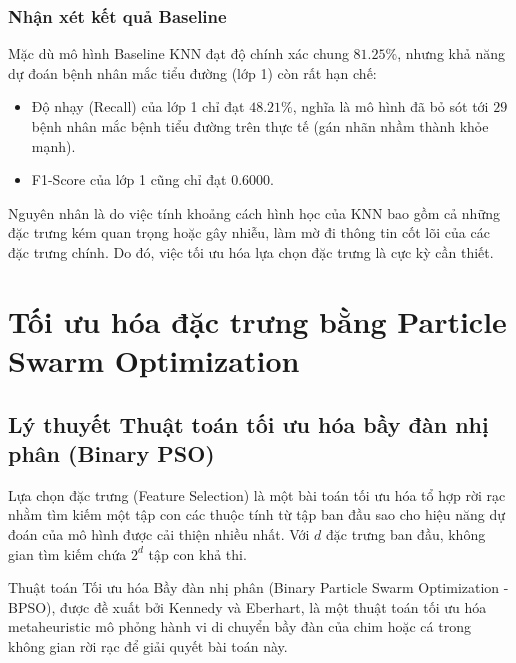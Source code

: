 \documentclass[a4paper,12pt]{report}
\begin{document}
\begin{itemize}
\subsection{Nhận xét kết quả Baseline}
Mặc dù mô hình Baseline KNN đạt độ chính xác chung $81.25\%$, nhưng khả năng dự đoán bệnh nhân mắc tiểu đường (lớp 1) còn rất hạn chế:
\begin{itemize}
    \item Độ nhạy (Recall) của lớp 1 chỉ đạt $48.21\%$, nghĩa là mô hình đã bỏ sót tới $29$ bệnh nhân mắc bệnh tiểu đường trên thực tế (gán nhãn nhầm thành khỏe mạnh).
    \item F1-Score của lớp 1 cũng chỉ đạt $0.6000$.
\end{itemize}
Nguyên nhân là do việc tính khoảng cách hình học của KNN bao gồm cả những đặc trưng kém quan trọng hoặc gây nhiễu, làm mờ đi thông tin cốt lõi của các đặc trưng chính. Do đó, việc tối ưu hóa lựa chọn đặc trưng là cực kỳ cần thiết.

\chapter{Tối ưu hóa đặc trưng bằng Particle Swarm Optimization}

\section{Lý thuyết Thuật toán tối ưu hóa bầy đàn nhị phân (Binary PSO)}
Lựa chọn đặc trưng (Feature Selection) là một bài toán tối ưu hóa tổ hợp rời rạc nhằm tìm kiếm một tập con các thuộc tính từ tập ban đầu sao cho hiệu năng dự đoán của mô hình được cải thiện nhiều nhất. Với $d$ đặc trưng ban đầu, không gian tìm kiếm chứa $2^d$ tập con khả thi. 

Thuật toán Tối ưu hóa Bầy đàn nhị phân (Binary Particle Swarm Optimization - BPSO), được đề xuất bởi Kennedy và Eberhart, là một thuật toán tối ưu hóa metaheuristic mô phỏng hành vi di chuyển bầy đàn của chim hoặc cá trong không gian rời rạc để giải quyết bài toán này.


\end{itemize}
\end{document}
